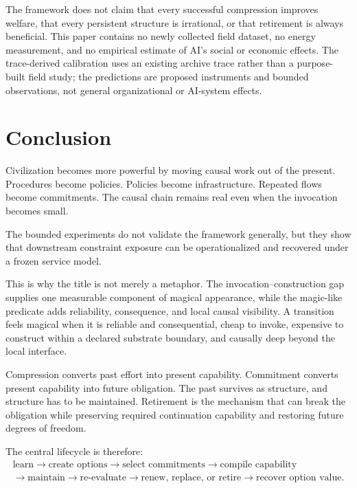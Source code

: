 \documentclass[11pt]{article}
\begin{document}
The framework does not claim that every successful compression improves welfare, that every persistent structure is irrational, or that retirement is always beneficial. This paper contains no newly collected field dataset, no energy measurement, and no empirical estimate of AI's social or economic effects. The trace-derived calibration uses an existing archive trace rather than a purpose-built field study; the predictions are proposed instruments and bounded observations, not general organizational or AI-system effects.

\section{Conclusion}

Civilization becomes more powerful by moving causal work out of the present. Procedures become policies. Policies become infrastructure. Repeated flows become commitments. The causal chain remains real even when the invocation becomes small.

The bounded experiments do not validate the framework generally, but they show that downstream constraint exposure can be operationalized and recovered under a frozen service model.

This is why the title is not merely a metaphor. The invocation--construction gap supplies one measurable component of magical appearance, while the magic-like predicate adds reliability, consequence, and local causal visibility. A transition feels magical when it is reliable and consequential, cheap to invoke, expensive to construct within a declared substrate boundary, and causally deep beyond the local interface.

Compression converts past effort into present capability. Commitment converts present capability into future obligation. The past survives as structure, and structure has to be maintained. Retirement is the mechanism that can break the obligation while preserving required continuation capability and restoring future degrees of freedom.

The central lifecycle is therefore:
\[
\begin{gathered}
\text{learn}\rightarrow\text{create options}\rightarrow\text{select commitments}\rightarrow\text{compile capability}\\
\rightarrow\text{maintain}\rightarrow\text{re-evaluate}\rightarrow\text{renew, replace, or retire}\rightarrow\text{recover option value}.
\end{gathered}
\]
\end{document}
